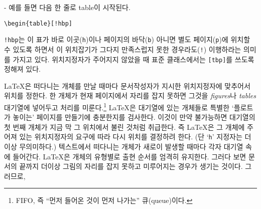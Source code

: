 \begin{adjustwidth}{0pt}{-\margheadwidth}
예를 들면 다음 한 줄로 table이 시작된다.
\begin{code}
\verb|\begin{table}[!hbp]|
\end{code}
\noindent {} \verb|!hbp|는 이 표가 바로 이곳(\texttt{h})이나 페이지의 바닥(\texttt{b})
아니면 별도 페이지(\texttt{p})에 위치할 수 있도록 하면서 이 위치잡기가 그다지 만족스럽지 못한 경우라도(\texttt{!})
이행하라는 의미를 가지고 있다. 위치지정자가 주어지지 않았을 때 표준 클래스에서는 \verb|[tbp]|를 쓰도록 정해져 있다.

\LaTeX 은 떠다니는 개체를 만날 때마다 문서작성자가 지시한 위치지정자에 맞추어서 위치를 정한다.
한 개체가 현재 페이지에서 자리를 잡지 못하면 그것을 \emph{figures}나 \emph{tables} 대기열에
넣어두고 처리를 미룬다.\footnote{FIFO, 즉 ``먼저 들어온 것이 먼저 나가는'' 큐(queue)이다.}
\LaTeX 은 대기열에 있는 개체들로 특별한 `플로트가 놓이는' 페이지를 만들기에 충분한지를 검사한다.
이것이 만약 불가능하면 대기열의 첫 번째 개체가 지금 막 그 위치에서 불린 것처럼 취급한다. 즉
\LaTeX 은 그 개체에 주어져 있는 위치지정자의 요구에 따라 다시 위치를 결정하려 한다. (단 `\texttt{h}'
지정자는 더이상 무의미하다.)
텍스트에서 떠다니는 개체가 새로이 발생할 때마다 각자 대기열 속에 들어간다.
\LaTeX 은 개체의 유형별로 출현 순서를 엄격히 유지한다. 그러다 보면 문서의 끝까지
더이상 그림의 자리를 잡지 못하고 미루어지는 경우가 생기는 것이다.
그러므로,


\end{adjustwidth}
